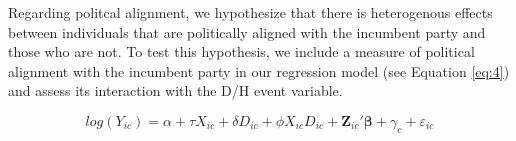 \documentclass{article}
\begin{document}



Regarding politcal alignment, we hypothesize that there is heterogenous effects between individuals that are politically aligned with the incumbent party and those who are not. To test this hypothesis, we include a measure of political alignment with the incumbent party in our regression model (see Equation \ref{eq:4}) and assess its interaction with the D/H event variable.

\begin{equation}
  \label{eq:4}
  log(Y_{ic}) = \alpha + \tau X_{ic} + \delta D_{ic} + \phi X_{ic}D_{ic} + \mathbf{Z}_{ic}'\mathbf{\beta} + \gamma_c + \varepsilon_{ic}
  \end{equation}
  
\end{document}
